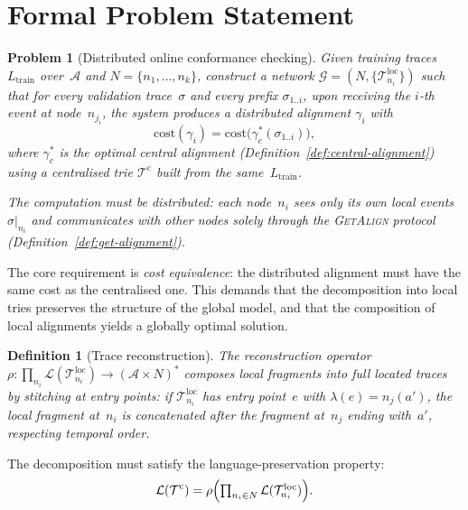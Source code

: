 \documentclass[11pt,a4paper]{article}
\newtheorem{definition}{Definition}
\newtheorem{problem}{Problem}
\newcommand{\A}{\mathcal{A}}
\newcommand{\Nodes}{N}
\newcommand{\Net}{\mathcal{G}}
\newcommand{\T}{\mathcal{T}}
\newcommand{\Tl}{\T^{\mathrm{loc}}}
\newcommand{\Tc}{\T^{\mathrm{c}}}
\newcommand{\Lg}{\mathcal{L}}
\newcommand{\cost}{\mathrm{cost}}
\newcommand{\alignment}{\gamma}
\newcommand{\trace}{\sigma}
\newcommand{\na}[2]{#1(#2)}
\newcommand{\GA}{\textsc{GetAlign}}
\begin{document}
\section{Formal Problem Statement}
\label{sec:problem}

\begin{problem}[Distributed online conformance checking]\label{prob:dcc}
  Given training traces $L_{\mathrm{train}}$ over~$\A$ and
  $\Nodes = \{n_1, \ldots, n_k\}$, construct a network
  $\Net = (\Nodes, \{\Tl_{n_i}\})$
  such that for every validation trace~$\trace$ and every prefix
  $\trace_{1..i}$, upon receiving the $i$-th event at node~$n_{j_i}$,
  the system produces a distributed alignment $\alignment_i$ with
  \[
    \cost(\alignment_i) = \cost\bigl(\alignment^{*}_c(\trace_{1..i})\bigr),
  \]
  where $\alignment^{*}_c$ is the optimal central alignment
  (Definition~\ref{def:central-alignment}) using a centralised trie
  $\Tc$ built from the same~$L_{\mathrm{train}}$.

  The computation must be \emph{distributed}: each node~$n_i$ sees only
  its own local events $\trace|_{n_i}$ and communicates with other nodes
  solely through the \GA{} protocol (Definition~\ref{def:get-alignment}).
\end{problem}

\medskip\noindent
The core requirement is \emph{cost equivalence}: the distributed
alignment must have the same cost as the centralised one.
This demands that the decomposition into local tries preserves the
structure of the global model, and that the composition of local
alignments yields a globally optimal solution.

\begin{definition}[Trace reconstruction]\label{def:reconstruction}
  The \emph{reconstruction operator}
  $\rho\colon \prod_{n_i} \Lg(\Tl_{n_i}) \to (\A \times \Nodes)^{*}$
  composes local fragments into full located traces by stitching at
  entry points: if $\Tl_{n_i}$ has entry point~$e$ with
  $\lambda(e) = \na{n_j}{a'}$, the local fragment at~$n_i$ is
  concatenated after the fragment at~$n_j$ ending with~$a'$, respecting
  temporal order.
\end{definition}

\noindent
The decomposition must satisfy the language-preservation property:
\begin{equation}\label{eq:lang-preservation}
  \Lg(\Tc)
  = \rho\Bigl(
      \textstyle\prod_{n_i \in \Nodes} \Lg(\Tl_{n_i})
    \Bigr).
\end{equation}
\end{document}
